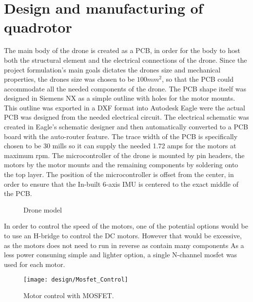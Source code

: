 \section{Design and manufacturing of quadrotor} 

The main body of the drone is created as a PCB, in order for the body to host both the structural element and the electrical connections of the drone. Since the project formulation’s main goals dictates the drones size and mechanical properties, the drones size was chosen to be $100 mm^2$, so that the PCB could accommodate all the needed components of the drone. The PCB shape itself was designed in Siemens NX as a simple outline with holes for the motor mounts. This outline was exported in a DXF format into Autodesk Eagle were the actual PCB was designed from the needed electrical circuit. The electrical schematic was created in Eagle’s schematic designer and then automatically converted to a PCB board with the auto-router feature. The trace width of the PCB is specifically chosen to be 30 mills so it can supply the needed 1.72 amps \cite{PCBTracewidth} for the motors at maximum rpm. The microcontroller of the drone is mounted by pin headers, the motors by the motor mounts and the remaining components by soldering onto the top layer. The position of the microcontroller is offset from the center, in order to ensure that the In-built 6-axis IMU is centered to the exact middle of the PCB.

\begin{figure}[H]%
    \centering
    \qquad
    \caption{Drone model}%
    \label{fig:example}%
\end{figure}

In order to control the speed of the motors, one of the potential options would be to use an H-bridge to control
the DC motors. However that would be excessive, as the motors does not need to run in reverse as contain many components
As a less power consuning simple and lighter option, a single N-channel mosfet was used for each motor.

\begin{figure}[H]
    \begin{center}
    \texttt{[image: design/Mosfet\_Control]}
    \end{center}
    \caption{Motor control with MOSFET.}
    \label{fig:Mosfet_Control}
\end{figure}

